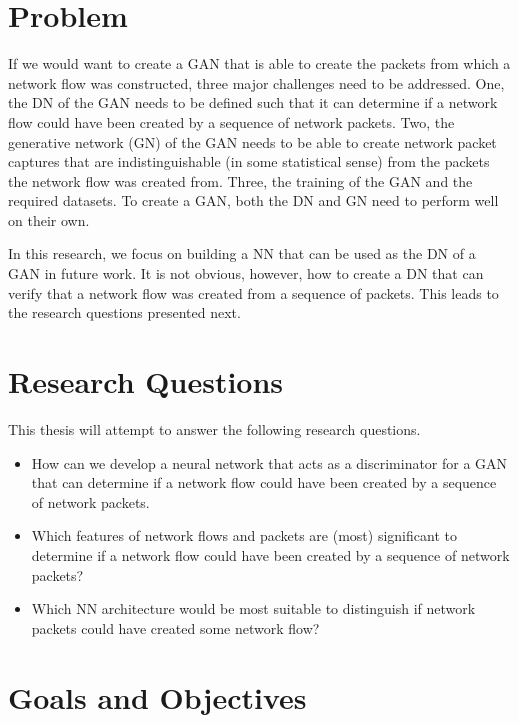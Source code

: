 \documentclass[
	ngerman,
	ruledheaders=section,%
	class=report,%
	thesis={type=bachelor},%
	accentcolor=9c,%
	custommargins=true,%
	marginpar=false,%
	parskip=half-,%
	fontsize=11pt,%
]{tudapub}
\begin{document}
\section{Problem}
\label{sec:problem}

If we would want to create a GAN that is able to create the packets from which a network flow was constructed,
three major challenges need to be addressed.
One, the DN of the GAN needs to be defined such that it can determine if a network flow could have been created by a sequence of network packets.
Two, the generative network (GN) of the GAN needs to be able to create network packet captures that are indistinguishable (in some statistical sense) from the packets the network flow was created from.
Three, the training of the GAN and the required datasets.
To create a GAN, both the DN and GN need to perform well on their own.

In this research, we focus on building a NN that can be used as the DN of a GAN in future work.
It is not obvious, however, how to create a DN that
can verify that a network flow was created from a sequence of packets.
This leads to the research questions presented next.

\section{Research Questions}
\label{sec:researchQuestions}

This thesis will attempt to answer the following research questions.

\begin{itemize}
  \item How can we develop a neural network that acts as a discriminator for a GAN
  that can determine if a network flow could have been created by a sequence of network packets.
  \item Which features of network flows and packets are (most) significant to determine if a network flow could have been created by a sequence of network packets?
  \item Which NN architecture would be most suitable to distinguish if network packets could have created some network flow?
\end{itemize}

\section{Goals and Objectives}
\label{sec:goals}

\end{document}
